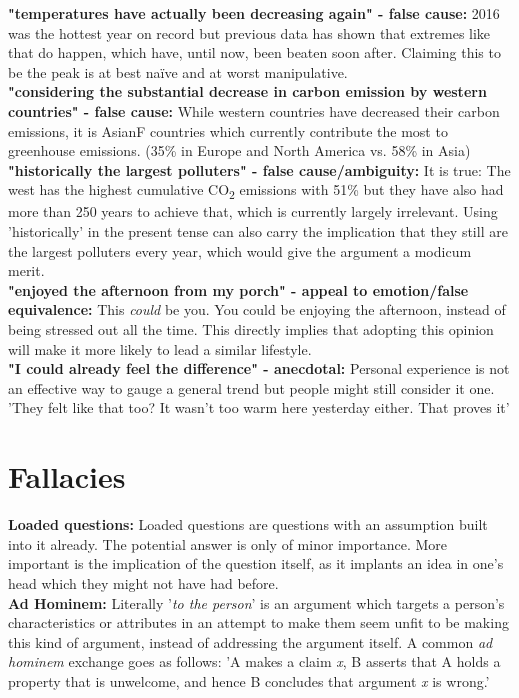 \documentclass{article}
\begin{document}
	\textbf{"temperatures have actually been decreasing again" - false cause:} 2016 was the hottest year on record but previous data has shown that extremes like that do happen, which have, until now, been beaten soon after. Claiming this to be the peak is at best naïve and at worst manipulative. \\

	\textbf{"considering the substantial decrease in carbon emission by western countries" - false cause:} While western countries have decreased their carbon emissions, it is AsianF countries which currently contribute the most to greenhouse emissions. (35\% in Europe and North America vs. 58\% in Asia) \\

	\textbf{"historically the largest polluters" - false cause/ambiguity:} It is true: The west has the highest cumulative CO\textsubscript{2} emissions with 51\% but they have also had more than 250 years to achieve that, which is currently largely irrelevant. Using 'historically' in the present tense can also carry the implication that they still are the largest polluters every year, which would give the argument a modicum merit. \\

	\textbf{"enjoyed the afternoon from my porch" - appeal to emotion/false equivalence:} This \textit{could} be you. You could be enjoying the afternoon, instead of being stressed out all the time. This directly implies that adopting this opinion will make it more likely to lead a similar lifestyle. \\

	\textbf{"I could already feel the difference" - anecdotal:} Personal experience is not an effective way to gauge a general trend but people might still consider it one. 'They felt like that too? It wasn't too warm here yesterday either. That proves it'

	\newpage

	\section*{Fallacies}
	\textbf{Loaded questions:} Loaded questions are questions with an assumption built into it already. The potential answer is only of minor importance. More important is the implication of the question itself, as it implants an idea in one's head which they might not have had before. \\

	\textbf{Ad Hominem:} Literally '\textit{to the person}' is an argument which targets a person's characteristics or attributes in an attempt to make them seem unfit to be making this kind of argument, instead of addressing the argument itself. A common \textit{ad hominem} exchange goes as follows: 'A makes a claim \textit{x}, B asserts that A holds a property that is unwelcome, and hence B concludes that argument \textit{x} is wrong.'\\
\end{document}
